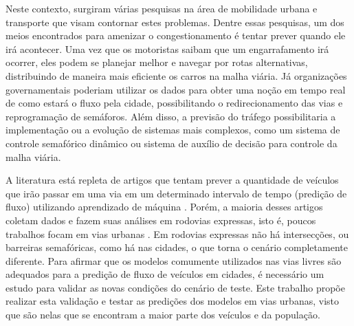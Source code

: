 Neste contexto, surgiram várias pesquisas na área de mobilidade urbana e transporte que visam contornar estes problemas. Dentre essas pesquisas, um dos meios encontrados para amenizar o congestionamento é tentar prever quando ele irá acontecer. Uma vez que os motoristas saibam que um engarrafamento irá ocorrer, eles podem se planejar melhor e navegar por rotas alternativas, distribuindo de maneira mais eficiente os carros na malha viária. Já organizações governamentais poderiam utilizar os dados para obter uma noção em tempo real de como estará o fluxo pela cidade, possibilitando o redirecionamento das vias e reprogramação de semáforos. Além disso, a previsão do tráfego possibilitaria a implementação ou a evolução de sistemas mais complexos, como um sistema de controle semafórico dinâmico ou sistema de auxílio de decisão para controle da malha viária.

A literatura está repleta de artigos que tentam prever a quantidade de veículos que irão passar em uma via em um determinado intervalo de tempo (predição de fluxo) utilizando aprendizado de máquina \cite{doi:10.1080/01441647.2014.992496, fu2016using, hamed_prediction_1995, lv_6894591, Seoul, wang_2018, Xiaolei_2015, Zainab_2018}. Porém, a maioria desses artigos coletam dados e fazem suas análises em rodovias expressas, isto é, poucos trabalhos focam em vias urbanas \cite{lana_2018}. Em rodovias expressas não há intersecções, ou barreiras semafóricas, como há nas cidades, o que torna o cenário completamente diferente. Para afirmar que os modelos comumente utilizados nas vias livres são adequados para a predição de fluxo de veículos em cidades, é necessário um estudo para validar as novas condições do cenário de teste. Este trabalho propõe realizar esta validação e testar as predições dos modelos em vias urbanas, visto que são nelas que se encontram a maior parte dos veículos e da população.






